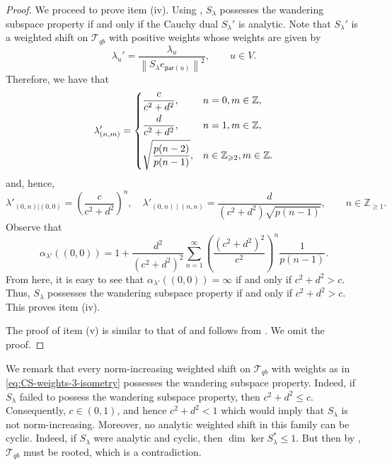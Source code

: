 \documentclass[11pt, reqno, a4paper]{amsart}
\theoremstyle{definition}
\newcommand{\scrT}{{\mathscr T}}
\newcommand{\norm}[1]{\left\lVert #1 \right\rVert}
\renewcommand{\le}{\leqslant}
\renewcommand{\ge}{\geqslant}
\newcommand{\Z}{\mathbb Z}
\newcommand{\pr}{\mathsf{par}}
\numberwithin{equation}{section}
\begin{document}
\begin{proof}
        We proceed to prove item {\rm (iv)}. Using , $S_{\lambda}$ possesses the wandering subspace property if and only if the Cauchy dual $S_{\lambda}'$ is analytic. Note that $S_{\lambda} '$ is a weighted shift on $\scrT_{qb}$ with positive weights whose weights are given by
        \begin{equation*}
            \lambda_{u} ' = \frac{\lambda_u}{\norm{S_{\lambda} e_{\pr (u)}}^{2}}, \qquad u \in V.
        \end{equation*}
        Therefore, we have that 
            \begin{equation*}
                \lambda'_{(n,m)} =\begin{dcases}
                    \frac{c}{c^2 + d^2}, & n=0, m\in \Z, \\
                    \frac{d}{c^2 + d^2}, & n=1, m \in \Z, \\
                    \sqrt{\frac{p(n-2)}{p(n-1)}}, & n \in \Z_{\ge 2}, m \in \Z.
                \end{dcases}
            \end{equation*}
        and, hence, 
        \begin{equation*}
            \lambda ' _{(0, n) | (0,0)} = \left( \frac{c}{c^2+d^2} \right)^{n}, \quad \lambda'_{(0,n) \mid (n,n)} = \frac{d}{(c^2 +d^2) \sqrt{p (n-1)}}, \qquad n \in \Z_{\ge 1}.
        \end{equation*}
        Observe that 
        \begin{equation*}
            \alpha_{\lambda'} ((0,0)) = 1 + \frac{d^2}{(c^2 + d^2)^2} \sum_{n=1}^{\infty} \left( \frac{(c^2 + d^2)^2}{c^2} \right)^{n} \frac{1}{p(n-1)}.
        \end{equation*}
        From here, it is easy to see that $\alpha_{\lambda'} ((0,0)) = \infty$ if and only if $c^2 + d^2 > c$. Thus, $S_{\lambda}$ possesses the wandering subspace property if and only if $c^2 + d^2 > c$. This proves item {\rm (iv)}.

        The proof of item {\rm (v)} is similar to that of  and follows from . We omit the proof.
    \end{proof}

    We remark that every norm-increasing weighted shift on $\scrT_{qb}$ with weights as in \eqref{eq:CS-weights-3-isometry} possesses the wandering subspace property. Indeed, if $S_{\lambda}$ failed to possess the wandering subspace property, then $c^2 + d^2 \le c$. Consequently, $c \in (0,1)$, and hence $c^2 + d^2 < 1$ which would imply that $S_{\lambda}$ is not norm-increasing. Moreover, no analytic weighted shift in this family can be cyclic. Indeed, if $S_{\lambda}$ were analytic and cyclic, then $\dim \ker S_{\lambda} ^{*} \le 1$. But then by , $\scrT_{qb}$ must be rooted, which is a contradiction.
\end{document}
